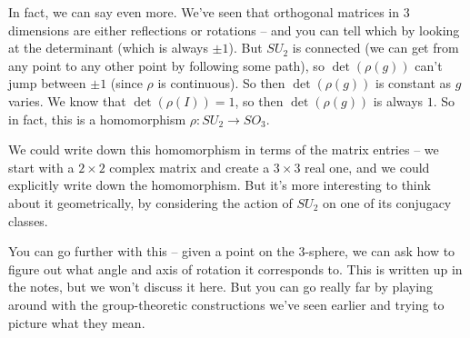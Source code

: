 In fact, we can say even more. We've seen that orthogonal matrices in $3$ dimensions are either reflections or rotations -- and you can tell which by looking at the determinant (which is always $\pm 1$). But $SU_2$ is connected (we can get from any point to any other point by following some path), so $\det(\rho(g))$ can't jump between $\pm 1$ (since $\rho$ is continuous). So then $\det(\rho(g))$ is constant as $g$ varies. We know that $\det(\rho(I)) = 1$, so then $\det(\rho(g))$ is always $1$. So in fact, this is a homomorphism $\rho : SU_2 \to SO_3$. 

\begin{note}
We could write down this homomorphism in terms of the matrix entries -- we start with a $2 \times 2$ complex matrix and create a $3 \times 3$ real one, and we could explicitly write down the homomorphism. But it's more interesting to think about it geometrically, by considering the action of $SU_2$ on one of its conjugacy classes. 
\end{note}

\begin{note}
You can go further with this -- given a point on the $3$-sphere, we can ask how to figure out what angle and axis of rotation it corresponds to. This is written up in the notes, but we won't discuss it here. But you can go really far by playing around with the group-theoretic constructions we've seen earlier and trying to picture what they mean. 
\end{note}



